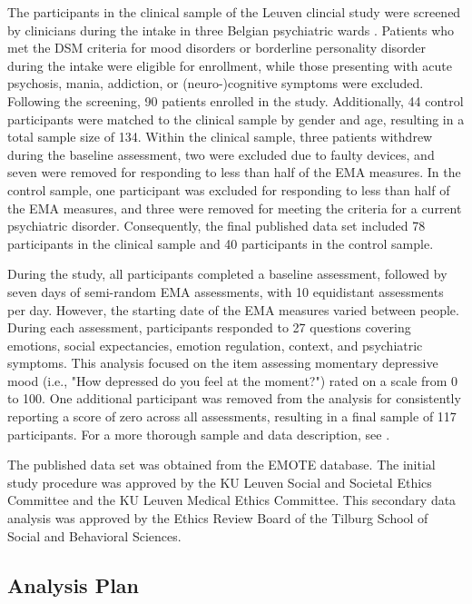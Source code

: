 \documentclass[man, floatsintext]{apa7}
\begin{document}
The participants in the clinical sample of the Leuven clincial study were
screened by clinicians during the intake
in three Belgian psychiatric wards \parencite{heininga_dynamical_2019}.
Patients who met the DSM
criteria for mood disorders or borderline personality disorder during the
intake were eligible for enrollment, while those presenting with acute
psychosis, mania, addiction, or (neuro-)cognitive symptoms were excluded.
Following the screening, 90 patients enrolled in the study. Additionally, 44
control participants were matched to the clinical sample by gender and age,
resulting in a total sample size of 134.
Within the clinical sample, three patients withdrew during the baseline
assessment, two were excluded due to faulty devices, and seven were removed for
responding to less than half of the EMA measures. In the control sample, one
participant was excluded for responding to less than half of the EMA measures,
and three were removed for meeting the criteria for a current psychiatric
disorder. Consequently, the final published data set included 78 participants
in the clinical sample and 40 participants in the control sample.

During the study, all participants completed a baseline assessment, followed by
seven days of semi-random EMA assessments, with 10 equidistant assessments per
day. However, the starting date of the EMA measures varied between people.
During each assessment, participants responded to 27 questions covering
emotions, social expectancies, emotion regulation, context, and psychiatric
symptoms. This analysis focused on the item assessing momentary depressive mood
(i.e., "How depressed do you feel at the moment?") rated on a scale from 0 to
100. One additional participant was removed from the analysis for consistently
reporting a score of zero across all assessments, resulting in a final sample
of 117 participants. For a more thorough sample and data description, see
\textcite{heininga_dynamical_2019}.

The published data set was obtained from the EMOTE database. The initial study
procedure was approved by the KU Leuven Social and Societal Ethics Committee
and the KU Leuven Medical Ethics Committee. This secondary data analysis was
approved by the Ethics Review Board of the Tilburg School of Social and
Behavioral Sciences.

\subsection{Analysis Plan}
\end{document}
